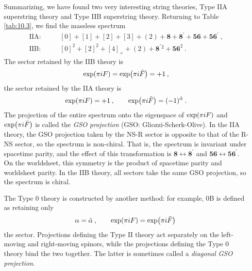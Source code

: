 	Summarizing, we have found two very interesting string theories, Type IIA superstring theory and Type IIB superstring theory. Returning to Table \ref{tab:10.3}, we find the massless spectrum
	\begin{subequations}
		\begin{align}
			\text{IIA:}&\qquad [0]+[1]+[2]+[3]+(2)+\mathbf{8}+\mathbf{8}^{\prime}+\mathbf{56}+\mathbf{56}^{\prime} \:,\label{10.6.8a} \\
			\text{IIB:}&\qquad [0]^{2}+[2]^{2}+[4]_{+}+(2) +\mathbf{8}^{\prime}{}^{2}+\mathbf{56}^{2} \:.\label{10.6.8b} 
		\end{align} \label{10.6.8}
	\end{subequations}
	The sector retained by the IIB theory is
	\begin{equation}
		\exp(\pi i F) =\exp(\pi i\tilde{F})=+1 \:,\label{10.6.9}
	\end{equation}
	the sector retained by the IIA theory is
	\begin{equation}
		\exp(\pi i F) = +1 \:, \qquad \exp(\pi i\tilde{F})=(-1)^{\tilde{\alpha}} \:.\label{10.6.10}
	\end{equation}
	The projection of the entire spectrum onto the eigenspace of $\exp(\pi i F)$ and $\exp(\pi i\tilde{F})$ is called the \emph{GSO projection} (GSO: Gliozzi-Scherk-Olive). In the IIA theory, the GSO projection taken by the NS-R sector is opposite to that of the R-NS sector, so the spectrum is non-chiral. That is, the spectrum is invariant under spacetime parity, and the effect of this transformation is $\mathbf{8}\leftrightarrow\mathbf{8}^{\prime}$ and $\mathbf{56}\leftrightarrow\mathbf{56}^{\prime}$. On the worldsheet, this symmetry is the product of spacetime parity and worldsheet parity. In the IIB theory, all sectors take the same GSO projection, so the spectrum is chiral.
	
	The Type 0 theory is constructed by another method: for example, 0B is defined as retaining only
	\begin{equation}
		\alpha=\tilde{\alpha}\:, \qquad \exp(\pi i F) =\exp(\pi i\tilde{F})\: \label{10.6.11}
	\end{equation}
	the sector. Projections defining the Type II theory act separately on the left-moving and right-moving spinors, while the projections defining the Type 0 theory bind the two together. The latter is sometimes called a \emph{diagonal GSO projection}.
	
